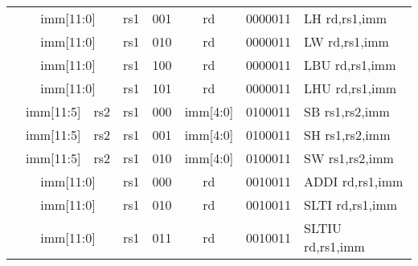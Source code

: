 \begin{table}[p]
\begin{small}
\begin{center}
\begin{tabular}{p{0in}p{0.4in}p{0.05in}p{0.05in}p{0.05in}p{0.05in}p{0.4in}p{0.6in}p{0.4in}p{0.6in}p{0.7in}l}
&
\multicolumn{6}{|c|}{imm[11:0]} &
\multicolumn{1}{c|}{rs1} &
\multicolumn{1}{c|}{001} &
\multicolumn{1}{c|}{rd} &
\multicolumn{1}{c|}{0000011} & LH rd,rs1,imm \\
\cline{2-11}
  

&
\multicolumn{6}{|c|}{imm[11:0]} &
\multicolumn{1}{c|}{rs1} &
\multicolumn{1}{c|}{010} &
\multicolumn{1}{c|}{rd} &
\multicolumn{1}{c|}{0000011} & LW rd,rs1,imm \\
\cline{2-11}
  

&
\multicolumn{6}{|c|}{imm[11:0]} &
\multicolumn{1}{c|}{rs1} &
\multicolumn{1}{c|}{100} &
\multicolumn{1}{c|}{rd} &
\multicolumn{1}{c|}{0000011} & LBU rd,rs1,imm \\
\cline{2-11}
  

&
\multicolumn{6}{|c|}{imm[11:0]} &
\multicolumn{1}{c|}{rs1} &
\multicolumn{1}{c|}{101} &
\multicolumn{1}{c|}{rd} &
\multicolumn{1}{c|}{0000011} & LHU rd,rs1,imm \\
\cline{2-11}
  

&
\multicolumn{4}{|c|}{imm[11:5]} &
\multicolumn{2}{c|}{rs2} &
\multicolumn{1}{c|}{rs1} &
\multicolumn{1}{c|}{000} &
\multicolumn{1}{c|}{imm[4:0]} &
\multicolumn{1}{c|}{0100011} & SB rs1,rs2,imm \\
\cline{2-11}
  

&
\multicolumn{4}{|c|}{imm[11:5]} &
\multicolumn{2}{c|}{rs2} &
\multicolumn{1}{c|}{rs1} &
\multicolumn{1}{c|}{001} &
\multicolumn{1}{c|}{imm[4:0]} &
\multicolumn{1}{c|}{0100011} & SH rs1,rs2,imm \\
\cline{2-11}
  

&
\multicolumn{4}{|c|}{imm[11:5]} &
\multicolumn{2}{c|}{rs2} &
\multicolumn{1}{c|}{rs1} &
\multicolumn{1}{c|}{010} &
\multicolumn{1}{c|}{imm[4:0]} &
\multicolumn{1}{c|}{0100011} & SW rs1,rs2,imm \\
\cline{2-11}
  

&
\multicolumn{6}{|c|}{imm[11:0]} &
\multicolumn{1}{c|}{rs1} &
\multicolumn{1}{c|}{000} &
\multicolumn{1}{c|}{rd} &
\multicolumn{1}{c|}{0010011} & ADDI rd,rs1,imm \\
\cline{2-11}
  

&
\multicolumn{6}{|c|}{imm[11:0]} &
\multicolumn{1}{c|}{rs1} &
\multicolumn{1}{c|}{010} &
\multicolumn{1}{c|}{rd} &
\multicolumn{1}{c|}{0010011} & SLTI rd,rs1,imm \\
\cline{2-11}
  

&
\multicolumn{6}{|c|}{imm[11:0]} &
\multicolumn{1}{c|}{rs1} &
\multicolumn{1}{c|}{011} &
\multicolumn{1}{c|}{rd} &
\multicolumn{1}{c|}{0010011} & SLTIU rd,rs1,imm \\
\cline{2-11}
  


\end{tabular}
\end{center}
\end{small}
\end{table}
